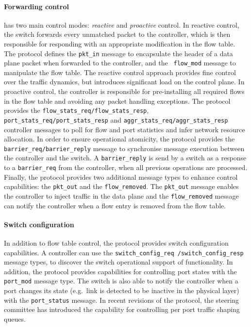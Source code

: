 \paragraph{Forwarding control}

\of has two main control modes: \emph{reactive} and \emph{proactive}
control. In reactive control, the switch forwards every unmatched packet to the
controller, which is then responsible for responding with an appropriate modification in the
flow table. The protocol defines the {\tt pkt\_in} message to encapsulate the
header of a data plane packet when forwarded to the controller, and the {\tt
  flow\_mod} message to manipulate the flow table. The reactive control
approach provides fine control over the traffic dynamics, but introduces
significant load on the control plane. In proactive control, the controller is
responsible for pre-installing all required flows in the flow table and avoiding any
packet handling exceptions. The \of protocol provides the
\texttt{flow\_stats\_req/flow\_stats\_resp},
\texttt{port\_stats\_req/port\_stats\_resp} and
\texttt{aggr\_stats\_req/aggr\_stats\_resp} controller messages to poll for flow
and port statistics and infer network resource allocation. In order to ensure
operational atomicity, the protocol provides the
\texttt{barrier\_req/barrier\_reply} message to synchronise message execution
between the controller and the switch. A {\tt barrier\_reply} is send by a
switch as a response to a {\tt barrier\_req} from the controller, when all
previous operations are processed.  Finally, the \of protocol provides two
additional message types to enhance control capabilities: the {\tt pkt\_out} and
the {\tt flow\_removed}. The {\tt pkt\_out} message enables the controller to
inject traffic in the data plane and the {\tt flow\_removed} message can notify
the controller when a flow entry is removed from the flow table.

\paragraph{Switch configuration} 

In addition to flow table control, the protocol provides switch configuration
capabilities. A \of controller can use the \texttt{switch\_config\_req
/switch\_config\_resp} message types, to discover the switch operational
support of \of functionality.  In addition, the protocol provides capabilities
for controlling port states with the {\tt port\_mod} message type. The switch
is also able to notify the controller when a port changes its state (e.g.~link
is detected to be inactive in the physical layer) with the {\tt port\_status}
message. In recent revisions of the protocol, the steering committee has
introduced the capability for controlling per port traffic shaping queues. 

